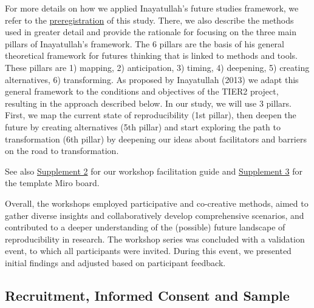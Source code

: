 \documentclass[authordate, meta]{jote-new-article}
\begin{document}
	For more details on how we applied Inayatullah's future studies framework, we refer to the \href{https://osf.io/wgtku}{preregistration} of this study. There, we also describe the methods used in greater detail and provide the rationale for focusing on the three main pillars of Inayatullah's framework. The 6 pillars are the basis of his general theoretical framework for futures thinking that is linked to methods and tools. These pillars are 1) mapping, 2) anticipation, 3) timing, 4) deepening, 5) creating alternatives, 6) transforming. As proposed by Inayatullah (2013) we adapt this general framework to the conditions and objectives of the TIER2 project, resulting in the approach described below. In our study, we will use 3 pillars. First, we map the current state of reproducibility (1st pillar), then deepen the future by creating alternatives (5th pillar) and start exploring the path to transformation (6th pillar) by deepening our ideas about facilitators and barriers on the road to transformation.







	See also \href{https://osf.io/n28sg/files/d8azf}{Supplement 2} for our workshop facilitation guide and \href{https://osf.io/n28sg/files/e4u7q}{Supplement 3} for the template Miro board.



	Overall, the workshops employed participative and co-creative methods, aimed to gather diverse insights and collaboratively develop comprehensive scenarios, and contributed to a deeper understanding of the (possible) future landscape of reproducibility in research. The workshop series was concluded with a validation event, to which all participants were invited. During this event, we presented initial findings and adjusted based on participant feedback.



	\subsection{Recruitment, Informed Consent and Sample}
\end{document}
